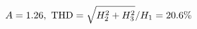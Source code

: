 \documentclass[preview]{standalone}
\begin{document}
\begin{align*}
\special{dvisvgm:raw <g id='unique000'>}A=1.26,\ \text{THD}=\sqrt{H_2^2+H_3^2}/H_1=20.6\%\special{dvisvgm:raw </g>}
\end{align*}
\end{document}
